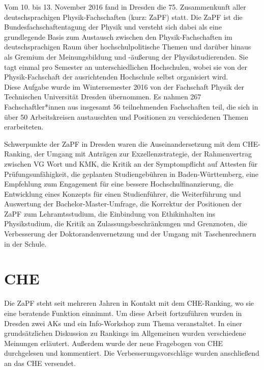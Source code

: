Vom 10. bis 13. November 2016 fand in Dresden die 75. Zusammenkunft
aller deutschsprachigen Physik-Fachschaften (kurz: ZaPF) statt.  Die ZaPF ist
die Bundesfachschaftentagung der Physik und versteht sich dabei als eine
grundlegende Basis zum Austausch zwischen den Physik-Fachschaften im
deutschsprachigen Raum über hochschulpolitische Themen und darüber hinaus als
Gremium der Meinungsbildung und -äußerung der Physikstudierenden. Sie tagt
einmal pro Semester an unterschiedlichen Hochschulen, wobei sie von der
Physik-Fachschaft der ausrichtenden Hochschule selbst organisiert wird. \\

Diese Aufgabe wurde im Wintersemester 2016 von der Fachschaft Physik der Technischen Universität Dresden übernommen. 
Es nahmen 267 Fachschaftler*innen aus insgesamt 56 teilnehmenden Fachschaften teil, 
die sich in über 50 Arbeitskreisen austauschten und Positionen zu verschiedenen Themen erarbeiteten.

Schwerpunkte der ZaPF in Dresden waren die Auseinandersetzung mit dem CHE-Ranking, der Umgang mit Anträgen zur Exzellenzstrategie, der Rahmenvertrag zwischen VG Wort und KMK, 
die Kritik an der Symptompflicht auf Attesten für Prüfungsunfähigkeit, die geplanten Studiengebühren in Baden-Württemberg, 
eine Empfehlung zum Engagement für eine bessere Hochschulfinanzierung, die Entwicklung eines Konzepts für einen Studienführer, 
die Weiterführung und Auswertung der Bachelor-Master-Umfrage, die Korrektur der Positionen der ZaPF zum Lehramtsstudium, die Einbindung von Ethikinhalten ins Physikstudium, 
die Kritik an Zulassungsbeschränkungen und Grenznoten, die Verbesserung der Doktorandenvernetzung und der Umgang mit Taschenrechnern in der Schule.


\newpage

\section*{CHE}
Die ZaPF steht seit mehreren Jahren in Kontakt mit dem CHE-Ranking, wo sie eine beratende Funktion einnimmt. Um diese Arbeit fortzuführen wurden in Dresden 
zwei AKs und ein Info-Workshop zum Thema veranstaltet. In einer grundsätzlichen Diskussion zu Rankings im Allgemeinen wurden verschiedene Meinungen erläutert. 
Außerdem wurde der neue Fragebogen von CHE durchgelesen und kommentiert. Die Verbesserungsvorschläge wurden anschließend an das CHE versendet.

